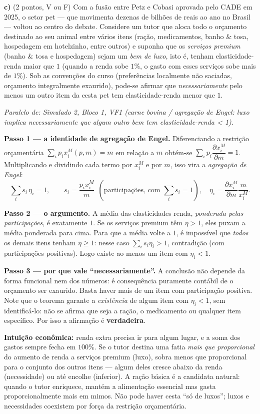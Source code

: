 \textbf{c)} (2 pontos, V ou F) Com a fusão entre Petz e Cobasi aprovada pelo CADE em 2025, o setor pet --- que movimenta dezenas de bilhões de reais ao ano no Brasil --- voltou ao centro do debate. Considere um tutor que aloca todo o orçamento destinado ao seu animal entre vários itens (ração, medicamentos, banho \& tosa, hospedagem em hotelzinho, entre outros) e suponha que os \emph{serviços premium} (banho \& tosa e hospedagem) sejam um \emph{bem de luxo}, isto é, tenham elasticidade-renda maior que $1$ (quando a renda sobe $1\%$, o gasto com esses serviços sobe mais de $1\%$). Sob as convenções do curso (preferências localmente não saciadas, orçamento integralmente exaurido), pode-se afirmar que \emph{necessariamente} pelo menos um outro item da cesta pet tem elasticidade-renda menor que $1$.

\begin{solucao}
{\footnotesize\textit{Paralelo de: Simulado 2, Bloco 1, VF1 (carne bovina / agregação de Engel: luxo implica necessariamente que algum outro bem tem elasticidade-renda < 1).}}\par\vspace{0.2em}
\textbf{Passo 1 --- a identidade de agregação de Engel.} Diferenciando a restrição orçamentária $\sum_i p_i x_i^{M}(p,m)=m$ em relação a $m$ obtém-se $\sum_i p_i \dfrac{\partial x_i^{M}}{\partial m}=1$. Multiplicando e dividindo cada termo por $x_i^{M}$ e por $m$, isso vira a \emph{agregação de Engel}:
\[
\sum_i s_i\,\eta_i=1,\qquad s_i=\frac{p_i x_i^{M}}{m}\ \ (\text{participações, com }\textstyle\sum_i s_i=1),\quad \eta_i=\frac{\partial x_i^{M}}{\partial m}\frac{m}{x_i^{M}}.
\]

\textbf{Passo 2 --- o argumento.} A média das elasticidades-renda, \emph{ponderada pelas participações}, é exatamente $1$. Se os serviços premium têm $\eta>1$, eles puxam a média ponderada para cima. Para que a média volte a $1$, é impossível que \emph{todos} os demais itens tenham $\eta\ge 1$: nesse caso $\sum_i s_i\eta_i>1$, contradição (com participações positivas). Logo existe ao menos um item com $\eta_i<1$.

\textbf{Passo 3 --- por que vale ``necessariamente''.} A conclusão não depende da forma funcional nem dos números: é consequência puramente contábil de o orçamento ser exaurido. Basta haver mais de um item com participação positiva. Note que o teorema garante a \emph{existência} de algum item com $\eta_i<1$, sem identificá-lo: não se afirma que seja a ração, o medicamento ou qualquer item específico. Por isso a afirmação é \textbf{verdadeira}.

\textbf{Intuição econômica:} renda extra precisa ir para algum lugar, e a soma dos gastos sempre fecha em $100\%$. Se o tutor destina uma fatia \emph{mais que proporcional} do aumento de renda a serviços premium (luxo), sobra menos que proporcional para o conjunto dos outros itens --- algum deles cresce abaixo da renda (necessidade) ou até encolhe (inferior). A ração básica é a candidata natural: quando o tutor enriquece, mantém a alimentação essencial mas gasta proporcionalmente mais em mimos. Não pode haver cesta ``só de luxos''; luxos e necessidades coexistem por força da restrição orçamentária.
\end{solucao}

